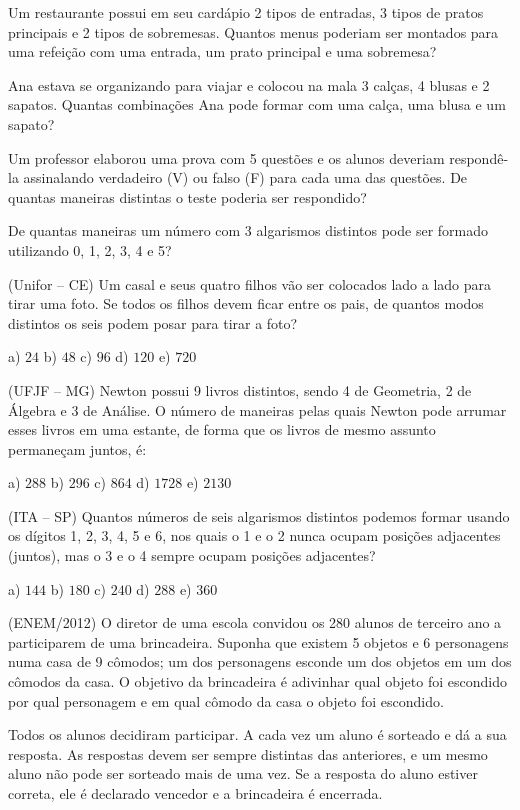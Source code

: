 \begin{multicols*}{2}
	\execnum Um restaurante possui em seu cardápio 2 tipos de entradas, 3 tipos de pratos principais e 2 tipos de sobremesas. Quantos menus poderiam ser montados para uma refeição com uma entrada, um prato principal e uma sobremesa?

	\execnum Ana estava se organizando para viajar e colocou na mala 3 calças, 4 blusas e 2 sapatos. Quantas combinações Ana pode formar com uma calça, uma blusa e um sapato?

	\execnum Um professor elaborou uma prova com 5 questões e os alunos deveriam respondê-la assinalando verdadeiro (V) ou falso (F) para cada uma das questões. De quantas maneiras distintas o teste poderia ser respondido?

	\execnum De quantas maneiras um número com 3 algarismos distintos pode ser formado utilizando 0, 1, 2, 3, 4 e 5?

	\execnum (Unifor -- CE) Um casal e seus quatro filhos vão ser colocados lado a lado para tirar uma foto. Se todos os filhos devem ficar entre os pais, de quantos modos distintos os seis podem posar para tirar a foto?

	a) $24 $ b) $48 $ c) $96 $ d) $120 $ e) $720 $

	\execnum (UFJF -- MG) Newton possui 9 livros distintos, sendo 4 de Geometria, 2 de Álgebra e 3 de Análise. O número de maneiras pelas quais Newton pode arrumar esses livros em uma estante, de forma que os livros de mesmo assunto permaneçam juntos, é:

	a) $288 $ b) $296 $ c) $864$ d) $1728 $ e) $2130 $

	\execnum (ITA -- SP) Quantos números de seis algarismos distintos podemos formar usando os dígitos 1, 2, 3, 4, 5 e 6, nos quais o 1 e o 2 nunca ocupam posições adjacentes (juntos), mas o 3 e o 4 sempre ocupam posições adjacentes?

	a) $144 $ b) $180 $ c) $240 $ d) $288 $ e) $360 $

	\execnum (ENEM/2012) O diretor de uma escola convidou os 280 alunos de terceiro ano a participarem de uma brincadeira. Suponha que existem 5 objetos e 6 personagens numa casa de 9 cômodos; um dos personagens esconde um dos objetos em um dos cômodos da casa. O objetivo da brincadeira é adivinhar qual objeto foi escondido por qual personagem e em qual cômodo da casa o objeto foi escondido.

	Todos os alunos decidiram participar. A cada vez um aluno é sorteado e dá a sua resposta. As respostas devem ser sempre distintas das anteriores, e um mesmo aluno não pode ser sorteado mais de uma vez. Se a resposta do aluno estiver correta, ele é declarado vencedor e a brincadeira é encerrada.


\end{multicols*}
